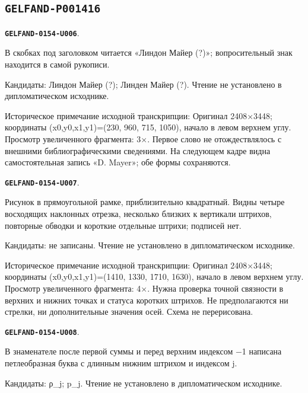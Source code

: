\documentclass[11pt]{article}
\theoremstyle{definition}
\theoremstyle{remark}
\begin{document}
\subsection*{\texttt{GELFAND-P001416}}
\par\noindent\leavevmode{}\label{GELFAND-0154-U006}\label{GELFAND-P001416:mayer-name:note}\textbf{\texttt{GELFAND-0154-U006}}.\nopagebreak[4]\par
В скобках под заголовком читается «Линдон Майер (?)»; вопросительный знак находится в самой рукописи.\par
Кандидаты: Линдон Майер (?); Линден Майер (?). Чтение не установлено в дипломатическом исходнике.\par
Историческое примечание исходной транскрипции: Оригинал 2408×3448; координаты (x0,y0,x1,y1)=(230, 960, 715, 1050), начало в левом верхнем углу. Просмотр увеличенного фрагмента: 3×. Первое слово не отождествлялось с внешними библиографическими сведениями. На следующем кадре видна самостоятельная запись «D. Mayer»; обе формы сохраняются.\par\medskip
\par\noindent\leavevmode{}\label{GELFAND-0154-U007}\label{GELFAND-P001416:interval-graph:note}\textbf{\texttt{GELFAND-0154-U007}}.\nopagebreak[4]\par
Рисунок в прямоугольной рамке, приблизительно квадратный. Видны четыре восходящих наклонных отрезка, несколько близких к вертикали штрихов, повторные обводки и короткие отдельные штрихи; подписей нет.\par
Кандидаты: не записаны. Чтение не установлено в дипломатическом исходнике.\par
Историческое примечание исходной транскрипции: Оригинал 2408×3448; координаты (x0,y0,x1,y1)=(1410, 1330, 1710, 1630), начало в левом верхнем углу. Просмотр увеличенного фрагмента: 4×. Нужна проверка точной связности в верхних и нижних точках и статуса коротких штрихов. Не предполагаются ни стрелки, ни дополнительные значения осей. Схема не перерисована.\par\medskip
\par\noindent\leavevmode{}\label{GELFAND-0154-U008}\label{GELFAND-P001416:slope-letter:note}\textbf{\texttt{GELFAND-0154-U008}}.\nopagebreak[4]\par
В знаменателе после первой суммы и перед верхним индексом −1 написана петлеобразная буква с длинным нижним штрихом и индексом j.\par
Кандидаты: ρ\_j; p\_j. Чтение не установлено в дипломатическом исходнике.\par
\end{document}
